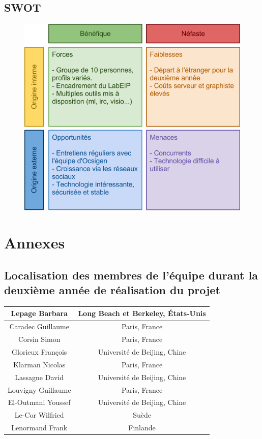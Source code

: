 \documentclass{life-fr}
\begin{document}
\section{SWOT}

\begin{figure}[H]
  \begin{center}
    \includegraphics[width=14cm]{img/swot_fr.png}
  \end{center}
\end{figure}


\chapter{Annexes}

\section{Localisation des membres de l'équipe durant la deuxième année de réalisation du projet}

\begin{tabular}{|c|c|}
  \hline
  Lepage Barbara & Long Beach et Berkeley, États-Unis\\
  \hline
  Caradec Guillaume & Paris, France\\
  \hline
  Corsin Simon & Paris, France\\
  \hline
  Glorieux François & Université de Beijing, Chine\\
  \hline
  Klarman Nicolas & Paris, France\\
  \hline
  Lassagne David & Université de Beijing, Chine\\
  \hline
  Louvigny Guillaume & Paris, France\\
  \hline
  El-Outmani Youssef & Université de Beijing, Chine\\
  \hline
  Le-Cor Wilfried & Suède\\
  \hline
  Lenormand Frank & Finlande\\
  \hline
\end{tabular}
\end{document}
